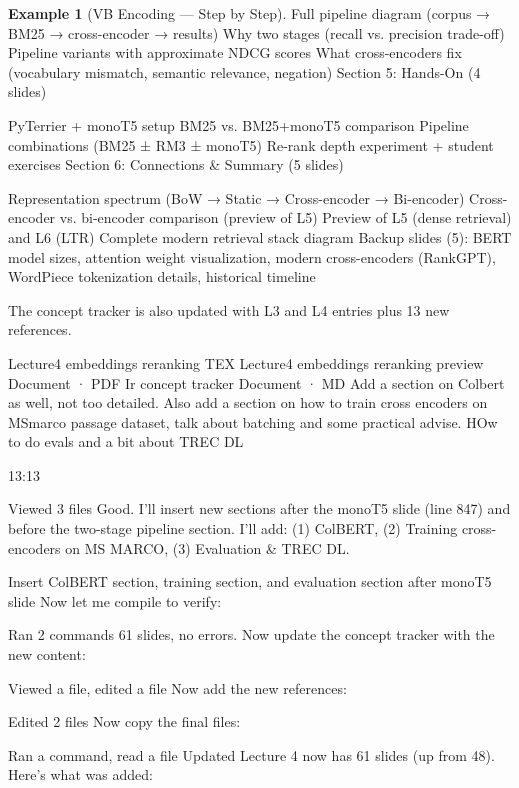 \documentclass[aspectratio=169]{beamer} \usetheme{TUDelft} %
\theoremstyle{definition}
\newtheorem{example}{Example}[section]
\theoremstyle{plain}
\begin{document}
\begin{example}[VB Encoding --- Step by Step]
Full pipeline diagram (corpus → BM25 → cross-encoder → results)
Why two stages (recall vs. precision trade-off)
Pipeline variants with approximate NDCG scores
What cross-encoders fix (vocabulary mismatch, semantic relevance, negation)
Section 5: Hands-On (4 slides)

PyTerrier + monoT5 setup
BM25 vs. BM25+monoT5 comparison
Pipeline combinations (BM25 ± RM3 ± monoT5)
Re-rank depth experiment + student exercises
Section 6: Connections & Summary (5 slides)

Representation spectrum (BoW → Static → Cross-encoder → Bi-encoder)
Cross-encoder vs. bi-encoder comparison (preview of L5)
Preview of L5 (dense retrieval) and L6 (LTR)
Complete modern retrieval stack diagram
Backup slides (5): BERT model sizes, attention weight visualization, modern cross-encoders (RankGPT), WordPiece tokenization details, historical timeline

The concept tracker is also updated with L3 and L4 entries plus 13 new references.

Lecture4 embeddings reranking
TEX 
Lecture4 embeddings reranking preview
Document · PDF 
Ir concept tracker
Document · MD 
Add a section on Colbert as well, not too detailed. Also add a section on how to train cross encoders on MSmarco passage dataset, talk about batching and some practical advise. HOw to do evals and a bit about TREC DL

13:13

Viewed 3 files
Good. I'll insert new sections after the monoT5 slide (line 847) and before the two-stage pipeline section. I'll add: (1) ColBERT, (2) Training cross-encoders on MS MARCO, (3) Evaluation & TREC DL.


Insert ColBERT section, training section, and evaluation section after monoT5 slide
Now let me compile to verify:


Ran 2 commands
61 slides, no errors. Now update the concept tracker with the new content:


Viewed a file, edited a file
Now add the new references:


Edited 2 files
Now copy the final files:


Ran a command, read a file
Updated Lecture 4 now has 61 slides (up from 48). Here's what was added:


\end{example}
\end{document}

